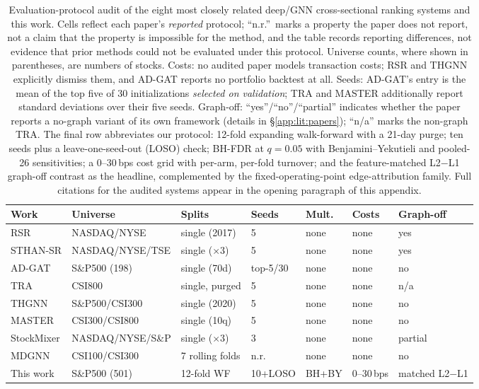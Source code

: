 \documentclass{article}
\begin{document}
\begin{table}[t]
\centering
\caption{Evaluation-protocol audit of the eight most closely related deep/GNN cross-sectional ranking systems and this work. Cells reflect each paper's \emph{reported} protocol; ``n.r.''\ marks a property the paper does not report, not a claim that the property is impossible for the method, and the table records reporting differences, not evidence that prior methods could not be evaluated under this protocol. Universe counts, where shown in parentheses, are numbers of stocks. Costs: no audited paper models transaction costs; RSR and THGNN explicitly dismiss them, and AD-GAT reports no portfolio backtest at all. Seeds: AD-GAT's entry is the mean of the top five of 30 initializations \emph{selected on validation}; TRA and MASTER additionally report standard deviations over their five seeds. Graph-off: ``yes''/``no''/``partial'' indicates whether the paper reports a no-graph variant of its own framework (details in \S\ref{app:lit:papers}); ``n/a'' marks the non-graph TRA. The final row abbreviates our protocol: 12-fold expanding walk-forward with a 21-day purge; ten seeds plus a leave-one-seed-out (LOSO) check; BH-FDR at $q=0.05$ with Benjamini--Yekutieli and pooled-26 sensitivities; a 0--30\,bps cost grid with per-arm, per-fold turnover; and the feature-matched L2$-$L1 graph-off contrast as the headline, complemented by the fixed-operating-point edge-attribution family. Full citations for the audited systems appear in the opening paragraph of this appendix.}
\label{app:lit:tab-matrix}
{\small
\setlength{\tabcolsep}{3pt}
\begin{tabular}{@{}lllllll@{}}
\toprule
Work & Universe & Splits & Seeds & Mult. & Costs & Graph-off \\
\midrule
RSR & NASDAQ/NYSE & single (2017) & 5 & none & none & yes \\
STHAN-SR & NASDAQ/NYSE/TSE & single ($\times$3) & 5 & none & none & yes \\
AD-GAT & S\&P500 (198) & single (70d) & top-5/30 & none & none & no \\
TRA & CSI800 & single, purged & 5 & none & none & n/a \\
THGNN & S\&P500/CSI300 & single (2020) & 5 & none & none & no \\
MASTER & CSI300/CSI800 & single (10q) & 5 & none & none & no \\
StockMixer & NASDAQ/NYSE/S\&P & single ($\times$3) & 3 & none & none & partial \\
MDGNN & CSI100/CSI300 & 7 rolling folds & n.r. & none & none & no \\
\midrule
This work & S\&P500 (501) & 12-fold WF & 10+LOSO & BH+BY & 0--30\,bps & matched L2$-$L1 \\
\bottomrule
\end{tabular}}
\end{table}
\end{document}
